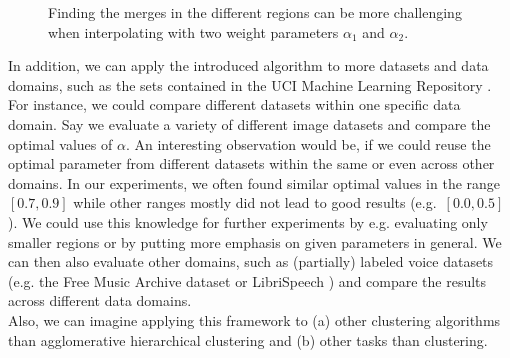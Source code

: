 \begin{figure}[h]
\centering
{}
\caption{Finding the merges in the different regions can be more challenging when interpolating with two weight parameters $\alpha_1$ and $\alpha_2$.}
\label{fig:convexhulls2}
\end{figure}

In addition, we can apply the introduced algorithm to more datasets and data domains, such as the sets contained in the UCI Machine Learning Repository \cite{Dua:2019}. For instance, we could compare different datasets within one specific data domain. Say we evaluate a variety of different image datasets and compare the optimal values of $\alpha$. An interesting observation would be, if we could reuse the optimal parameter from different datasets within the same or even across other domains. In our experiments, we often found similar optimal values in the range $[0.7,0.9]$ while other ranges mostly did not lead to good results (e.g.\ $[0.0, 0.5]$). We could use this knowledge for further experiments by e.g. evaluating only smaller regions or by putting more emphasis on given parameters in general. We can then also evaluate other domains, such as (partially) labeled voice datasets (e.g. the Free Music Archive dataset \cite{fma} or LibriSpeech \cite{librispeech}) and compare the results across different data domains.\\

Also, we can imagine applying this framework to (a) other clustering algorithms than agglomerative hierarchical clustering and (b) other tasks than clustering.